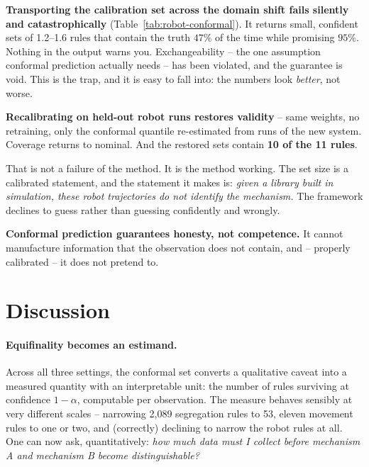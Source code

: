 \documentclass[11pt]{article}
\begin{document}
\textbf{Transporting the calibration set across the domain shift fails silently and
catastrophically} (Table~\ref{tab:robot-conformal}). It returns small, confident sets
of 1.2--1.6 rules that contain the truth $47\%$ of the time while promising $95\%$.
Nothing in the output warns you. Exchangeability -- the one assumption conformal
prediction actually needs -- has been violated, and the guarantee is void. This is the
trap, and it is easy to fall into: the numbers look \emph{better}, not worse.

\textbf{Recalibrating on held-out robot runs restores validity} -- same weights, no
retraining, only the conformal quantile re-estimated from runs of the new system.
Coverage returns to nominal. And the restored sets contain \textbf{10 of the 11
rules}.

That is not a failure of the method. It is the method working. The set size is a
calibrated statement, and the statement it makes is: \emph{given a library built in
simulation, these robot trajectories do not identify the mechanism.} The framework
declines to guess rather than guessing confidently and wrongly.

\textbf{Conformal prediction guarantees honesty, not competence.} It cannot
manufacture information that the observation does not contain, and -- properly
calibrated -- it does not pretend to.

\section{Discussion}

\paragraph{Equifinality becomes an estimand.}
Across all three settings, the conformal set converts a qualitative caveat into a
measured quantity with an interpretable unit: the number of rules surviving at
confidence $1-\alpha$, computable per observation. The measure behaves sensibly at
very different scales -- narrowing 2,089 segregation rules to 53, eleven movement
rules to one or two, and (correctly) declining to narrow the robot rules at all. One
can now ask, quantitatively: \emph{how much data must I collect before mechanism A and
mechanism B become distinguishable?}
\end{document}
